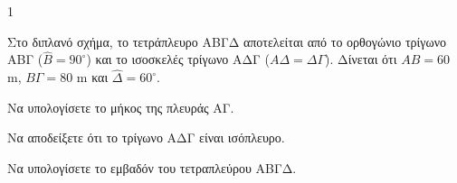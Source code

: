 \begin{ylh}{1}
    \item [Γεωμετρία]
\end{ylh}
\begin{figure}
\centering
{}
\end{figure}
Στο διπλανό σχήμα, το τετράπλευρο ΑΒΓΔ αποτελείται από το ορθογώνιο τρίγωνο ΑΒΓ ($\hat{B}=90^\circ$) και το ισοσκελές τρίγωνο ΑΔΓ ($ΑΔ=ΔΓ$). Δίνεται ότι $ΑΒ = 60$ m, $ΒΓ = 80$ m και $\hat{\Delta} = 60^\circ$.

\begin{alist}
\item Να υπολογίσετε το μήκος της πλευράς ΑΓ. 
\item Να αποδείξετε ότι το τρίγωνο ΑΔΓ είναι ισόπλευρο. 
\item Να υπολογίσετε το εμβαδόν του τετραπλεύρου ΑΒΓΔ. 
\end{alist}